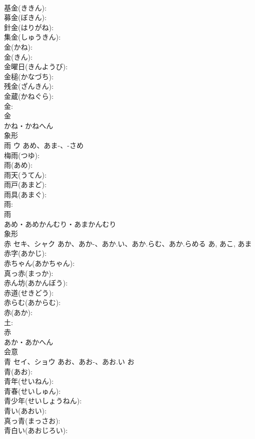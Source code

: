 \documentclass[8pt]{extreport}
\begin{document}
\begin{CJK}{UTF8}{min}
\\	基金(ききん): 
\\	募金(ぼきん): 
\\	針金(はりがね): 
\\	集金(しゅうきん): 
\\	金(かね): 
\\	金(きん): 
\\	金曜日(きんようび): 
\\	金槌(かなづち): 
\\	残金(ざんきん): 
\\	金蔵(かねぐら): 
\\	金: 
\\	金	
\\	かね・かねへん	
\\	象形 
\\	雨	ウ	あめ、あま-、-さめ		
\\	梅雨(つゆ): 
\\	雨(あめ): 
\\	雨天(うてん): 
\\	雨戸(あまど): 
\\	雨具(あまぐ): 
\\	雨: 
\\	雨	
\\	あめ・あめかんむり・あまかんむり	
\\	象形 
\\	赤	セキ、シャク	あか、あか-、あか.い、あか.らむ、あか.らめる	あ, あこ, あま	
\\	赤字(あかじ): 
\\	赤ちゃん(あかちゃん): 
\\	真っ赤(まっか): 
\\	赤ん坊(あかんぼう): 
\\	赤道(せきどう): 
\\	赤らむ(あからむ): 
\\	赤(あか): 
\\	土: 
\\	赤	
\\	あか・あかへん	
\\	会意 
\\	青	セイ、ショウ	あお、あお-、あお.い	お	
\\	青(あお): 
\\	青年(せいねん): 
\\	青春(せいしゅん): 
\\	青少年(せいしょうねん): 
\\	青い(あおい): 
\\	真っ青(まっさお): 
\\	青白い(あおじろい): 

\end{CJK}
\end{document}
